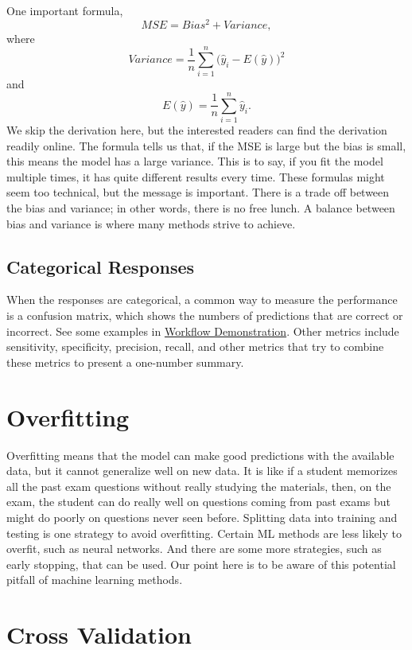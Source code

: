 \documentclass[
]{book}
\begin{document}
One important formula,
\[MSE = Bias^2 + Variance,\]
where
\[Variance = \frac{1}{n} \sum_{i=1}^n \bigg( \hat{y}_i - E(\hat{y}) \bigg)^2\]
and
\[E(\hat{y}) = \frac{1}{n} \sum_{i=1}^n \hat{y}_i.\]
We skip the derivation here, but the interested readers can find the derivation readily online. The formula tells us that, if the MSE is large but the bias is small, this means the model has a large variance. This is to say, if you fit the model multiple times, it has quite different results every time. These formulas might seem too technical, but the message is important. There is a trade off between the bias and variance; in other words, there is no free lunch. A balance between bias and variance is where many methods strive to achieve.

\hypertarget{categorical-responses}{%
\subsection{Categorical Responses}\label{categorical-responses}}

When the responses are categorical, a common way to measure the performance is a confusion matrix, which shows the numbers of predictions that are correct or incorrect. See some examples in \protect\hyperlink{workflow-demonstration}{Workflow Demonstration}. Other metrics include sensitivity, specificity, precision, recall, and other metrics that try to combine these metrics to present a one-number summary.

\hypertarget{overfitting}{%
\section{Overfitting}\label{overfitting}}

Overfitting means that the model can make good predictions with the available data, but it cannot generalize well on new data. It is like if a student memorizes all the past exam questions without really studying the materials, then, on the exam, the student can do really well on questions coming from past exams but might do poorly on questions never seen before. Splitting data into training and testing is one strategy to avoid overfitting. Certain ML methods are less likely to overfit, such as neural networks. And there are some more strategies, such as early stopping, that can be used. Our point here is to be aware of this potential pitfall of machine learning methods.

\hypertarget{cross-validation}{%
\section{Cross Validation}\label{cross-validation}}
\end{document}
